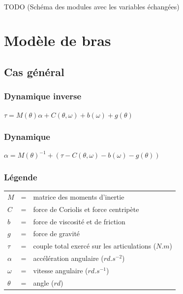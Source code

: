 \documentclass[pdftex,a4paper,11pt]{article}
\begin{document}
\paragraph{}
TODO (Schéma des modules avec les variables échangées) %


\section{Modèle de bras}


\subsection{Cas général}

\subsubsection{Dynamique inverse}
$\tau = M(\theta)\alpha + C(\theta, \omega) + b(\omega) + g(\theta) $

\subsubsection{Dynamique}
$\alpha = M(\theta)^{-1} + (\tau - C(\theta, \omega) - b(\omega) - g(\theta)) $

\subsubsection{Légende}
\begin{tabular}{lcl}
    $M$      & = & matrice des moments d'inertie \\ %
    $C$      & = & force de Coriolis et force centripète \\
    $b$      & = & force de viscosité et de friction \\ %
    $g$      & = & force de gravité \\
    $\tau$   & = & couple total exercé sur les articulations ($N.m$) \\
    $\alpha$ & = & accélération angulaire ($rd.s^{-2}$) \\
    $\omega$ & = & vitesse angulaire ($rd.s^{-1}$) \\
    $\theta$ & = & angle ($rd$) \\
\end{tabular}
\end{document}
